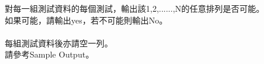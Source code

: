 對每一組測試資料的每個測試，輸出該1,2,......,N的任意排列是否可能。\\
如果可能，請輸出yes，若不可能則輸出No。\\
\\
每組測試資料後亦請空一列。\\
請參考Sample Output。\\
